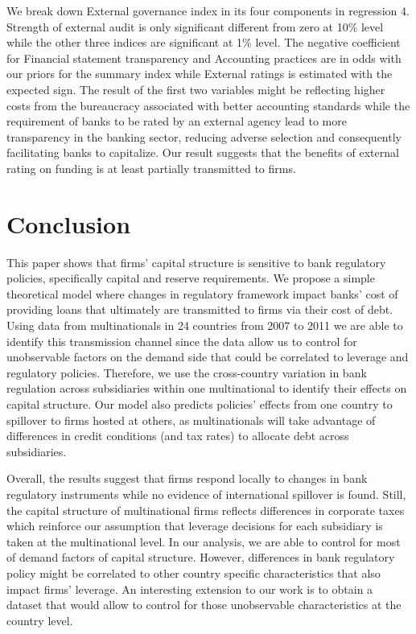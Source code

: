 \documentclass[12pt]{article}
\begin{document}
We break down External governance index in its four components in regression 4. Strength of external audit is only significant different from zero at 10\% level while the other three indices are significant at 1\% level. The negative coefficient for Financial statement transparency and Accounting practices are in odds with our priors for the summary index while External ratings is estimated with the expected sign. The result of the first two variables might be reflecting higher costs from the bureaucracy associated with better accounting standards while the requirement of banks to be rated by an external agency lead to more transparency in the banking sector, reducing adverse selection and consequently facilitating banks to capitalize. Our result suggests that the benefits of external rating on funding is at least partially transmitted to firms.         
    	
 
	\section{Conclusion} \label{sec:conclusion}
		
	This paper shows that firms' capital structure is sensitive to bank regulatory policies, specifically capital and reserve requirements. We propose a simple theoretical model where changes in regulatory framework impact banks' cost of providing loans that ultimately are transmitted to firms via their cost of debt. Using data from multinationals in 24 countries from 2007 to 2011 we are able to identify this transmission channel since the data allow us to control for unobservable factors on the demand side that could be correlated to leverage and regulatory policies. Therefore, we use the cross-country variation in bank regulation across subsidiaries within one multinational to identify their effects on capital structure. Our model also predicts policies' effects from one country to spillover to firms hosted at others, as multinationals will take advantage of differences in credit conditions (and tax rates) to allocate debt across subsidiaries. 
	
	Overall, the results suggest that firms respond locally to changes in bank regulatory instruments while no evidence of international spillover is found. Still, the capital structure of multinational firms reflects differences in corporate taxes which reinforce our assumption that leverage decisions for each subsidiary is taken at the multinational level. In our analysis, we are able to control for most of demand factors of capital structure. However, differences in bank regulatory policy might be correlated to other country specific characteristics that also impact firms' leverage. An interesting extension to our work is to obtain a dataset that would allow to control for those unobservable characteristics at the country level.
\end{document}
